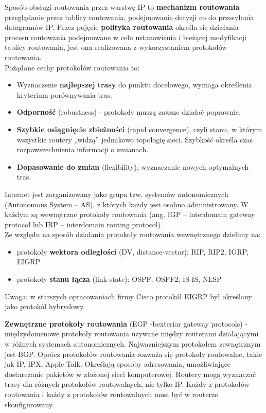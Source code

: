 \documentclass[../main.tex]{subfiles}
\begin{document}
    Sposób obsługi routowania przez warstwę IP to \textbf{mechanizm routowania} -
    przeglądanie przez tablicy routowania, podejmowanie decyzji co do przesyłania datagramów IP.
    Przez pojęcie \textbf{polityka routowania} określa się działania procesu routowania podejmowane w
    celu ustanowienia i bieżącej modyfikacji tablicy routowania, jest ona realizowana z wykorzystaniem protokołów routowania.\\

    Pożądane cechy protokołów routowania to:
    \begin{itemize}
        \item Wyznaczenie \textbf{najlepszej trasy} do punktu docelowego, wymaga określenia kryterium porównywania tras.
        \item \textbf{Odporność} (robustness) - protokoły muszą zawsze działać poprawnie.
        \item \textbf{Szybkie osiągnięcie zbieżności} (rapid convergence), czyli stanu, w którym wszystkie routery „widzą” jednakowo topologię sieci.
        Szybkość określa czas rozpowszechnienia informacji o zmianach.
        \item \textbf{Dopasowanie do zmian} (flexibility), wyznaczanie nowych optymalnych tras.
    \end{itemize}

    Internet jest zorganizowany jako grupa tzw. systemów autonomicznych (Autonomous
    System – AS), z których każdy jest osobno administrowany. W każdym są wewnętrzne protokoły routowania (ang. IGP – interdomain gateway protocol lub IRP – interdomain routing protocol).\\

    Ze względu na sposób działania protokoły routowania wewnętrznego dzielimy na:
    \begin{itemize}
        \item protokoły \textbf{wektora odległości} (DV, distance-vector): RIP, RIP2, IGRP, EIGRP
        \item protokoły \textbf{stanu łącza} (link-state): OSPF, OSPF2, IS-IS, NLSP
    \end{itemize}
    Uwaga: w starszych opracowaniach firmy Cisco protokół EIGRP był określany jako protokół
    hybrydowy.

    \textbf{Zewnętrzne protokoły routowania} (EGP -bexterior gateway protocols) - międzydomenowe protokoły routowania używane między routerami działającymi w różnych systemach autonomicznych.
    Najważniejszym protokołem zewnętrznym jest BGP.
    Oprócz protokołów routowania rozważa się protokoły routowalne, takie jak IP, IPX, Apple
    Talk. Określają sposoby adresowania, umożliwiające dostarczanie
    pakietów w złożonej sieci komputerowej. Routery mogą wyznaczać trasy dla różnych
    protokołów routowalnych, nie tylko IP. Każdy z protokołów routowania i każdy z protokołów
    routowalnych musi być w routerze skonfigurowany.
\end{document}
